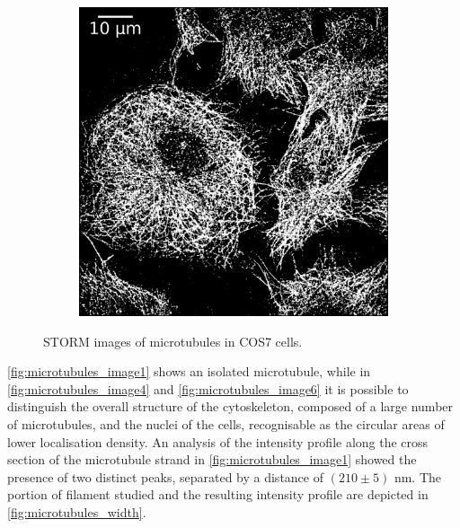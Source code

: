 \begin{figure}
\begin{subfigure}{0.32\textwidth}
        \caption{}
        \label{fig:microtubules_image4}
    \end{subfigure}
    \begin{subfigure}{0.32\textwidth}
        \includegraphics[width=\textwidth]{figures/microtubules_image6.png}
        \caption{}
        \label{fig:microtubules_image6}
    \end{subfigure}
    \caption{STORM images of microtubules in COS7 cells.}
    \label{fig:microtubules_images}
\end{figure}
%
\autoref{fig:microtubules_image1} shows an isolated microtubule, while in \autoref{fig:microtubules_image4} and \autoref{fig:microtubules_image6} it is possible to distinguish the overall structure of the cytoskeleton, composed of a large number of microtubules, and the nuclei of the cells, recognisable as the circular areas of lower localisation density.
An analysis of the intensity profile along the cross section of the microtubule strand in \autoref{fig:microtubules_image1} showed the presence of two distinct peaks, separated by a distance of $(210 \pm 5)$ nm.
The portion of filament studied and the resulting intensity profile are depicted in \autoref{fig:microtubules_width}.
%

